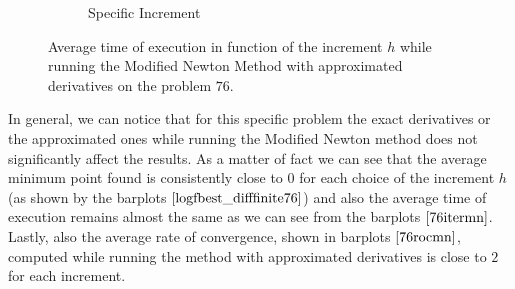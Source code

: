 \begin{figure}[htbp]
\begin{subfigure}[t]{0.45\textwidth}
        \caption{Specific Increment }
    \end{subfigure}
    \caption{ \small Average time of execution in function of the increment $h$  while running the Modified Newton Method with approximated derivatives on the problem $76$.}
    \label{76itermn}
\end{figure}

In general, we can notice that for this specific problem the exact derivatives or the approximated ones while running the Modified Newton method does not significantly affect the results. As a matter of fact we can see that the average minimum point found is consistently close to $0$ for each choice of the increment $h$ (as shown by the barplots $\eqref{logfbest_difffinite76}$) and also the average time of execution remains almost the same as we can see from the barplots $\eqref{76itermn}$. 
Lastly, also the average rate of convergence, shown in barplots $\eqref{76rocmn}$,  computed while running the method with approximated derivatives is close to $2$ for each increment.


